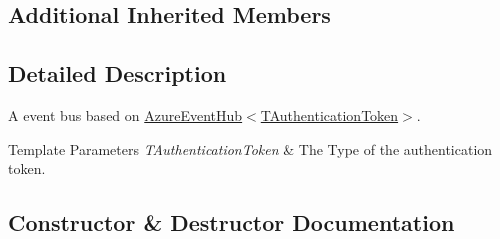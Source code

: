 \subsection*{Additional Inherited Members}


\subsection{Detailed Description}
A event bus based on \hyperlink{classCqrs_1_1Azure_1_1ServiceBus_1_1AzureEventHub_adef2c26639ae4a7725c397da7fd90000_adef2c26639ae4a7725c397da7fd90000}{Azure\+Event\+Hub$<$\+T\+Authentication\+Token$>$}. 


\begin{DoxyTemplParams}{Template Parameters}
{\em T\+Authentication\+Token} & The Type of the authentication token.\\
\hline
\end{DoxyTemplParams}


\subsection{Constructor \& Destructor Documentation}
\mbox{\label{classCqrs_1_1Azure_1_1ServiceBus_1_1AzureEventHubBus_aef24d23dd76d6bb0f58b582e2abf9872_aef24d23dd76d6bb0f58b582e2abf9872}} 
